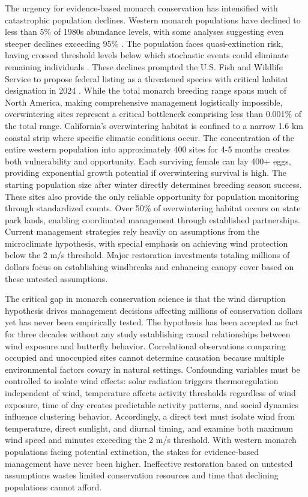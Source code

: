 The urgency for evidence-based monarch conservation has intensified with catastrophic population declines. Western monarch populations have declined to less than 5\% of 1980s abundance levels, with some analyses suggesting even steeper declines exceeding 95\% \citep{peltonWesternMonarchPopulation2019}. The population faces quasi-extinction risk, having crossed threshold levels below which stochastic events could eliminate remaining individuals \citep{schultzCitizenScienceMonitoring2017}. These declines prompted the U.S. Fish and Wildlife Service to propose federal listing as a threatened species with critical habitat designation in 2024 \citep{u.s.fishandwildlifeserviceEndangeredThreatenedWildlife2024}. While the total monarch breeding range spans much of North America, making comprehensive management logistically impossible, overwintering sites represent a critical bottleneck comprising less than 0.001\% of the total range. California's overwintering habitat is confined to a narrow 1.6 km coastal strip where specific climatic conditions occur. The concentration of the entire western population into approximately 400 sites for 4-5 months creates both vulnerability and opportunity. Each surviving female can lay 400+ eggs, providing exponential growth potential if overwintering survival is high. The starting population size after winter directly determines breeding season success. These sites also provide the only reliable opportunity for population monitoring through standardized counts. Over 50\% of overwintering habitat occurs on state park lands, enabling coordinated management through established partnerships. Current management strategies rely heavily on assumptions from the microclimate hypothesis, with special emphasis on achieving wind protection below the 2 m/s threshold. Major restoration investments totaling millions of dollars focus on establishing windbreaks and enhancing canopy cover based on these untested assumptions.

The critical gap in monarch conservation science is that the wind disruption hypothesis drives management decisions affecting millions of conservation dollars yet has never been empirically tested. The hypothesis has been accepted as fact for three decades without any study establishing causal relationships between wind exposure and butterfly behavior. Correlational observations comparing occupied and unoccupied sites cannot determine causation because multiple environmental factors covary in natural settings. Confounding variables must be controlled to isolate wind effects: solar radiation triggers thermoregulation independent of wind, temperature affects activity thresholds regardless of wind exposure, time of day creates predictable activity patterns, and social dynamics influence clustering behavior. Accordingly, a direct test must isolate wind from temperature, direct sunlight, and diurnal timing, and examine both maximum wind speed and minutes exceeding the 2 m/s threshold. With western monarch populations facing potential extinction, the stakes for evidence-based management have never been higher. Ineffective restoration based on untested assumptions wastes limited conservation resources and time that declining populations cannot afford.

